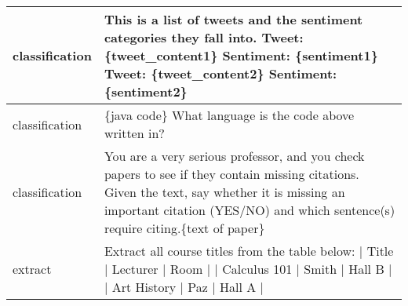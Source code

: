 \begin{longtable}{p{} p{}}
classification &                                                                                                                                                                                                                                      This is a list of tweets and the sentiment categories they fall into.{\newline} {\newline}{\newline} Tweet: \{tweet\_content1\}{\newline} Sentiment: \{sentiment1\}{\newline} {\newline}{\newline} Tweet: \{tweet\_content2\}{\newline} Sentiment: \{sentiment2\} \\ \midrule
classification &                                                                                                                                                                                                                                                                                                                                                               \{java code\}{\newline} {\newline}{\newline} What language is the code above written in? \\ \midrule
classification &                                                                                                                                                                                           You are a very serious professor, and you check papers to see if they contain missing citations. Given the text, say whether it is missing an important citation (YES/NO) and which sentence(s) require citing.{\newline}{\newline}\{text of paper\} \\ \midrule
       extract &                                                                                                                                                                                                                                                                      Extract all course titles from the table below:{\newline} {\newline}{\newline} | Title | Lecturer | Room |{\newline} | Calculus 101 | Smith | Hall B |{\newline} | Art History | Paz | Hall A | \\ \midrule

\end{longtable}
